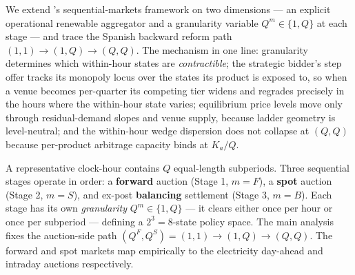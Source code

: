 \documentclass[11pt,a4paper]{article}
\theoremstyle{definition}
\theoremstyle{remark}
\theoremstyle{plain}
\begin{document}
We extend \citet{ito_reguant_2016}'s sequential-markets framework on two dimensions --- an explicit operational renewable aggregator and a granularity variable $Q^m \in \{1, Q\}$ at each stage --- and trace the Spanish backward reform path $(1,1) \to (1,Q) \to (Q,Q)$. The mechanism in one line: granularity determines which within-hour states are \emph{contractible}; the strategic bidder's step offer tracks its monopoly locus over the states its product is exposed to, so when a venue becomes per-quarter its competing tier widens and regrades precisely in the hours where the within-hour state varies; equilibrium price levels move only through residual-demand slopes and venue supply, because ladder geometry is level-neutral; and the within-hour wedge dispersion does not collapse at $(Q,Q)$ because per-product arbitrage capacity binds at $K_a/Q$.

A representative clock-hour contains $Q$ equal-length subperiods. Three sequential stages operate in order: a \textbf{forward} auction (Stage 1, $m=F$), a \textbf{spot} auction (Stage 2, $m=S$), and ex-post \textbf{balancing} settlement (Stage 3, $m=B$). Each stage has its own \emph{granularity} $Q^m \in \{1, Q\}$ --- it clears either once per hour or once per subperiod --- defining a $2^3 = 8$-state policy space. The main analysis fixes the auction-side path $(Q^{F}, Q^{S}) = (1,1) \to (1,Q) \to (Q,Q)$. The forward and spot markets map empirically to the electricity day-ahead and intraday auctions respectively.
\end{document}
